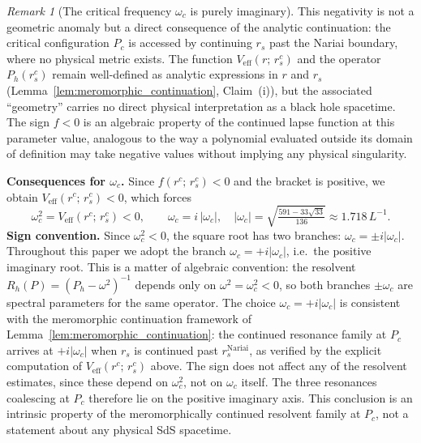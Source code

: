 \documentclass[12pt,a4paper]{amsart}
\theoremstyle{remark}
\newtheorem{remark}[theorem]{Remark}
\begin{document}
\begin{remark}[The critical frequency $\omega_c$ is purely imaginary]
This negativity is not a geometric anomaly but a direct consequence of
the analytic continuation: the critical configuration $P_c$ is accessed
by continuing $r_s$ past the Nariai boundary, where no physical metric exists.
The function $V_{\mathrm{eff}}(r;\,r_s^c)$ and the operator $P_h(r_s^c)$
remain well-defined as analytic expressions in $r$ and $r_s$
(Lemma~\ref{lem:meromorphic_continuation}, Claim~(i)), but the associated
``geometry'' carries no direct physical interpretation as a black hole spacetime.
The sign $f < 0$ is an algebraic property of the continued lapse function
at this parameter value, analogous to the way a polynomial evaluated outside
its domain of definition may take negative values without implying any
physical singularity.

\medskip
\noindent\textbf{Consequences for $\omega_c$.}
Since $f(r^c;\,r_s^c) < 0$ and the bracket is positive, we obtain
$V_{\mathrm{eff}}(r^c;\,r_s^c) < 0$, which forces
\[
  \omega_c^2 = V_{\mathrm{eff}}(r^c;\,r_s^c) < 0,
  \qquad
  \omega_c = i\,|\omega_c|, \quad |\omega_c| = \sqrt{\tfrac{591 - 33\sqrt{33}}{136}} \approx 1.718\,L^{-1}.
\]
\textbf{Sign convention.}
Since $\omega_c^2 < 0$, the square root has two branches: $\omega_c = \pm i|\omega_c|$.
Throughout this paper we adopt the branch $\omega_c = +i|\omega_c|$, i.e.\ the
positive imaginary root.
This is a matter of algebraic convention: the resolvent $R_h(P) = (P_h - \omega^2)^{-1}$
depends only on $\omega^2 = \omega_c^2 < 0$, so both branches $\pm\omega_c$ are
spectral parameters for the same operator.
The choice $\omega_c = +i|\omega_c|$ is consistent with the meromorphic continuation
framework of Lemma~\ref{lem:meromorphic_continuation}: the continued resonance family
at $P_c$ arrives at $+i|\omega_c|$ when $r_s$ is continued past $r_s^{\mathrm{Nariai}}$,
as verified by the explicit computation of $V_{\mathrm{eff}}(r^c;\,r_s^c)$ above.
The sign does not affect any of the resolvent estimates, since these depend on
$\omega_c^2$, not on $\omega_c$ itself.
The three resonances coalescing at $P_c$ therefore lie on the positive imaginary axis.
This conclusion is an intrinsic property of the meromorphically continued resolvent
family at $P_c$, not a statement about any physical SdS spacetime.


\end{remark}
\end{document}
